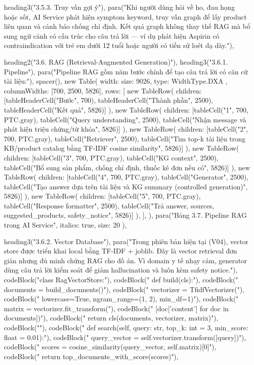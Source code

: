 {{{  heading3("3.5.3. Truy vấn gợi ý"),
  para("Khi người dùng hỏi về ho, đau họng hoặc sốt, AI Service phát hiện symptom keyword, truy vấn graph để lấy product liên quan và cảnh báo chống chỉ định. Kết quả graph không thay thế RAG mà bổ sung ngữ cảnh có cấu trúc cho câu trả lời — ví dụ phát hiện Aspirin có contraindication với trẻ em dưới 12 tuổi hoặc người có tiền sử loét dạ dày."),

  heading2("3.6. RAG (Retrieval-Augmented Generation)"),
  heading3("3.6.1. Pipeline"),
  para("Pipeline RAG gồm năm bước chính để tạo câu trả lời có căn cứ tài liệu:"),
  spacer(),
  new Table({
    width: { size: 9026, type: WidthType.DXA },
    columnWidths: [700, 2500, 5826],
    rows: [
      new TableRow({ children: [tableHeaderCell("Bước", 700), tableHeaderCell("Thành phần", 2500), tableHeaderCell("Kết quả", 5826)] }),
      new TableRow({ children: [tableCell("1", 700, PTC.gray), tableCell("Query understanding", 2500), tableCell("Nhận message và phát hiện triệu chứng/từ khóa", 5826)] }),
      new TableRow({ children: [tableCell("2", 700, PTC.gray), tableCell("Retriever", 2500), tableCell("Tìm top-k tài liệu trong KB/product catalog bằng TF-IDF cosine similarity", 5826)] }),
      new TableRow({ children: [tableCell("3", 700, PTC.gray), tableCell("KG context", 2500), tableCell("Bổ sung sản phẩm, chống chỉ định, thuốc kê đơn nếu có", 5826)] }),
      new TableRow({ children: [tableCell("4", 700, PTC.gray), tableCell("Generator", 2500), tableCell("Tạo answer dựa trên tài liệu và KG summary (controlled generation)", 5826)] }),
      new TableRow({ children: [tableCell("5", 700, PTC.gray), tableCell("Response formatter", 2500), tableCell("Trả answer, sources, suggested_products, safety_notice", 5826)] }),
    ],
  }),
  para("Bảng 3.7. Pipeline RAG trong AI Service", { italics: true, size: 20 }),

  heading3("3.6.2. Vector Database"),
  para("Trong phiên bản hiện tại (V04), vector store được triển khai local bằng TF-IDF + joblib. Đây là vector retrieval đơn giản nhưng đủ minh chứng RAG cho đồ án. Vì domain y tế nhạy cảm, generator dùng câu trả lời kiểm soát để giảm hallucination và luôn kèm safety notice."),
  codeBlock("class RagVectorStore:"),
  codeBlock("    def build(cls):"),
  codeBlock("        documents = build_documents()"),
  codeBlock("        vectorizer = TfidfVectorizer("),
  codeBlock("            lowercase=True, ngram_range=(1, 2), min_df=1)"),
  codeBlock("        matrix = vectorizer.fit_transform("),
  codeBlock("            [doc['content'] for doc in documents])"),
  codeBlock("        return cls(documents, vectorizer, matrix)"),
  codeBlock(""),
  codeBlock("    def search(self, query: str, top_k: int = 3, min_score: float = 0.01):"),
  codeBlock("        query_vector = self.vectorizer.transform([query])"),
  codeBlock("        scores = cosine_similarity(query_vector, self.matrix)[0]"),
  codeBlock("        return top_documents_with_score(scores)"),

}}}
